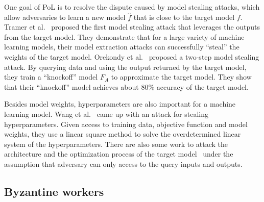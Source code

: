 \documentclass[conference]{IEEEtran}
\begin{document}
One goal of PoL is to resolve the dispute caused by model stealing attacks, 
which allow adversaries to {learn\EndAccSupp{}} a new model $\hat{f}$ that is close to the {target\EndAccSupp{}} model $f$.
Tramer et al.~\cite{tramer2016stealing} proposed the first model stealing attack that leverages the outputs from the {target\EndAccSupp{}} model.
They demonstrate that for a large variety of machine {learning\EndAccSupp{}} models, their  model {extraction\EndAccSupp{}} attacks can successfully  ``steal'' the weights of the target model.
Orekondy et al.~\cite{orekondy2019knockoff} proposed a two-step model stealing attack.
By {querying\EndAccSupp{}} data and using the output returned by the target model, they train a ``knockoff'' model $F_A$ to {approximate\EndAccSupp{}} the target model. 
They show that their ``knockoff'' model achieves about 80$\%$ {accuracy\EndAccSupp{}} of the target model.

Besides model weights, hyperparameters are also important for a machine {learning\EndAccSupp{}} model.
Wang et al.~\cite{wang2018stealing} came up with an attack for stealing  hyperparameters. 
Given access to training data, objective function and model weights, 
they use a linear {square\EndAccSupp{}} method to solve the overdetermined linear {system\EndAccSupp{}} of the hyperparameters.
There are also some work to attack the {architecture\EndAccSupp{}} and the optimization process of the target model~\cite{oh2019towards} under the assumption that adversary can only access to the {query\EndAccSupp{}} {inputs\EndAccSupp{}} and outputs. 


\subsection{Byzantine workers}
\end{document}
